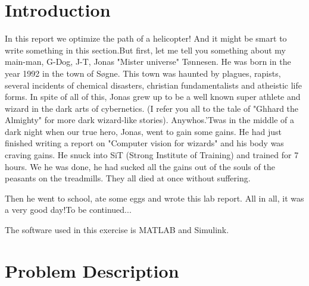 \documentclass[11pt,a4paper,USenglish]{article} %
\date{Spring 2016}
\begin{document}
\makelabreportfrontpage



\tableofcontents
\clearpage

\section{Introduction}
In this report we optimize the path of a helicopter! And it might be smart to write something in this section.\newline But first, let me tell you something about my main-man, G-Dog, J-T, Jonas "Mister universe" T\o nnesen. He was born in the year 1992 in the town of S\o gne. This town was haunted by plagues, rapists, several incidents of chemical disasters, christian fundamentalists and atheistic life forms. In spite of all of this, Jonas grew up to be a well known super athlete and wizard in the dark arts of cybernetics. (I refer you all to the tale of "Ghhard the Almighty" for more dark wizard-like stories). Anywhos.\newline 'Twas in the middle of a dark night when our true hero, Jonas, went to gain some gains. He had just finished writing a report on "Computer vision for wizards" and his body was craving gains. He snuck into SiT (Strong Institute of Training) and trained for 7 hours. We he was done, he had sucked all the gains out of the souls of the peasants on the treadmills. They all died at once without suffering.

Then he went to school, ate some eggs and wrote this lab report. All in all, it was a very good day!\newline To be continued...


The software used in this exercise is MATLAB and Simulink.

\section{Problem Description}\label{sec:prob_descr}
\end{document}
